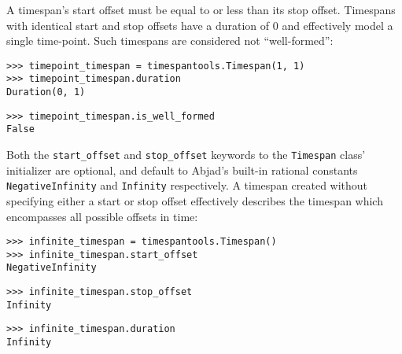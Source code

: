 \noindent A timespan's start offset must be equal to or less than its stop
offset. Timespans with identical start and stop offsets have a duration of 0
and effectively model a single time-point. Such timespans are considered not
\enquote{well-formed}:

\begin{comment}
<abjad>
timepoint_timespan = timespantools.Timespan(1, 1)
timepoint_timespan.duration
timepoint_timespan.is_well_formed
</abjad>
\end{comment}

\begin{abjadbookoutput}
\begin{singlespacing}
\vspace{-0.5\baselineskip}
\begin{verbatim}
>>> timepoint_timespan = timespantools.Timespan(1, 1)
>>> timepoint_timespan.duration
Duration(0, 1)
\end{verbatim}
\begin{verbatim}
>>> timepoint_timespan.is_well_formed
False
\end{verbatim}
\end{singlespacing}
\end{abjadbookoutput}

\noindent Both the \texttt{start\_offset} and \texttt{stop\_offset} keywords to
the \texttt{Timespan} class' initializer are optional, and default to Abjad's
built-in rational constants \texttt{NegativeInfinity} and \texttt{Infinity}
respectively. A timespan created without specifying either a start or stop
offset effectively describes the timespan which encompasses all possible
offsets in time:

\begin{comment}
<abjad>
infinite_timespan = timespantools.Timespan()
infinite_timespan.start_offset
infinite_timespan.stop_offset
infinite_timespan.duration
</abjad>
\end{comment}

\begin{abjadbookoutput}
\begin{singlespacing}
\vspace{-0.5\baselineskip}
\begin{verbatim}
>>> infinite_timespan = timespantools.Timespan()
>>> infinite_timespan.start_offset
NegativeInfinity
\end{verbatim}
\begin{verbatim}
>>> infinite_timespan.stop_offset
Infinity
\end{verbatim}
\begin{verbatim}
>>> infinite_timespan.duration
Infinity
\end{verbatim}
\end{singlespacing}
\end{abjadbookoutput}

